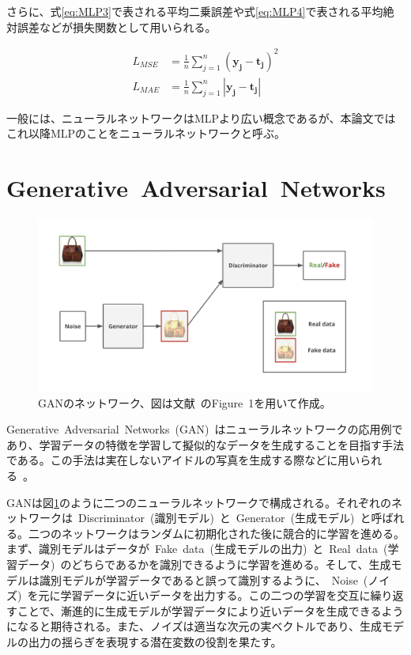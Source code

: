 さらに、式\ref{eq:MLP3}で表される平均二乗誤差や式\ref{eq:MLP4}で表される平均絶対誤差などが損失関数として用いられる。

\begin{align}
    \label{eq:MLP3}
    L_{MSE}&=\frac{1}{n}\sum _{j=1} ^{n} {(\boldsymbol{y_j} - \boldsymbol{t_j})^2}\\
    \label{eq:MLP4}
    L_{MAE}&=\frac{1}{n}\sum _{j=1} ^{n} {|\boldsymbol{y_j} - \boldsymbol{t_j}|}
\end{align}

一般には、ニューラルネットワークはMLPより広い概念であるが、本論文ではこれ以降MLPのことをニューラルネットワークと呼ぶ。

\section{Generative~Adversarial~Networks}

\begin{figure}[t]
\begin{center}
\includegraphics[width=\hsize]{figure/GAN_net.png}
\caption{GANのネットワーク、図は文献~\cite{pix2pix}のFigure~1を用いて作成。}
\label{fig:GAN_net}
\end{center}
\end{figure}

Generative~Adversarial~Networks~(GAN)~\cite{GAN}はニューラルネットワークの応用例であり、学習データの特徴を学習して擬似的なデータを生成することを目指す手法である。この手法は実在しないアイドルの写真を生成する際などに用いられる~\cite{idol}。

GANは図\ref{fig:GAN_net}のように二つのニューラルネットワークで構成される。それぞれのネットワークは~Discriminator~(識別モデル)~と~Generator~(生成モデル)~と呼ばれる。二つのネットワークはランダムに初期化された後に競合的に学習を進める。まず、識別モデルはデータが~Fake~data~(生成モデルの出力)~と~Real~data~(学習データ)~のどちらであるかを識別できるように学習を進める。そして、生成モデルは識別モデルが学習データであると誤って識別するように、~Noise~(ノイズ)~を元に学習データに近いデータを出力する。この二つの学習を交互に繰り返すことで、漸進的に生成モデルが学習データにより近いデータを生成できるようになると期待される。また、ノイズは適当な次元の実ベクトルであり、生成モデルの出力の揺らぎを表現する潜在変数の役割を果たす。

